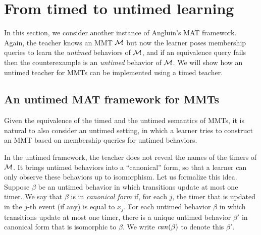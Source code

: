\newcommand{\Constraints}[1]{\mathsf{constraints}({#1})}
\newcommand{\Frac}[1]{\mathsf{frac}({#1})}
\newcommand{\Addtimer}[4]{\mathsf{addtimer}({#1,#2,#3,#4})}

\section{From timed to untimed learning}  
\label{algorithm}
In this section, we consider another instance of Angluin's MAT framework.
Again, the teacher knows an MMT ${\mathcal M}$ but now the learner poses membership queries
to learn the \emph{untimed} behaviors of ${\mathcal M}$, and if an equivalence query fails then the counterexample is an \emph{untimed} behavior of ${\mathcal M}$.
We will show how an untimed teacher for MMTs can be implemented using a timed teacher.

\subsection{An untimed MAT framework for MMTs}
Given the equivalence of the timed and the untimed semantics of MMTs, it is natural to also 
consider an untimed setting, in which a learner tries to construct an MMT based on membership queries for untimed behaviors.

In the untimed framework, the teacher does not reveal the names of the timers of ${\mathcal M}$. 
It brings untimed behaviors into a ``canonical'' form, so that a learner can only observe these behaviors up to isomorphism.
Let us formalize this idea.
Suppose $\beta$ be an untimed behavior in which transitions update at most one timer.
We say that $\beta$ is in \emph{canonical form} if, for each $j$, the timer that is updated in the $j$-th event
(if any) is equal to $x_j$.
For each untimed behavior $\beta$ in which transitions update at most one timer, there is a unique untimed behavior
$\beta'$ in canonical form that is isomorphic to $\beta$.
We write $\mathit{can}({\beta})$ to denote this $\beta'$.

